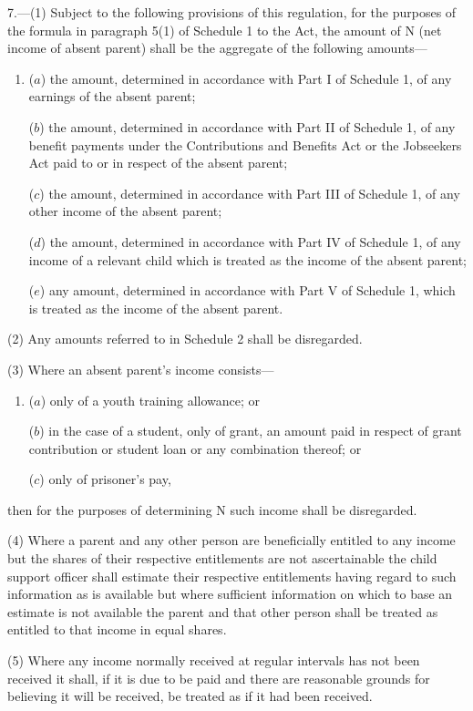 \documentclass[12pt,a4paper]{article}
\begin{document}
7.—(1) Subject to the following provisions of this regulation, for the purposes of the formula in paragraph 5(1) of Schedule 1 to the Act, the amount of N (net income of absent parent) shall be the aggregate of the following amounts—
\begin{enumerate}\item[]
($a$) the amount, determined in accordance with Part I of Schedule 1, of any earnings of the absent parent;

($b$) the amount, determined in accordance with Part II of Schedule 1, of any benefit payments under the Contributions and Benefits Act 
or the Jobseekers Act  %
paid to or in respect of the absent parent;

($c$) the amount, determined in accordance with Part III of Schedule 1, of any other income of the absent parent;

($d$) the amount, determined in accordance with Part IV of Schedule 1, of any income of a relevant child which is treated as the income of the absent parent;

($e$) any amount, determined in accordance with Part V of Schedule 1, which is treated as the income of the absent parent.
\end{enumerate}

(2) Any amounts referred to in Schedule 2 shall be disregarded.

(3) Where an absent parent’s income consists—
\begin{enumerate}\item[]
($a$) only of a youth training allowance; or

($b$) in the case of a student, only of grant, an amount paid in respect of grant contribution or student loan or any combination thereof; or

($c$) only of prisoner’s pay,
\end{enumerate}
then for the purposes of determining N such income shall be disregarded.

(4) Where a parent and any other person are beneficially entitled to any income but the shares of their respective entitlements are not ascertainable the child support officer shall estimate their respective entitlements having regard to such information as is available but where sufficient information on which to base an estimate is not available the parent and that other person shall be treated as entitled to that income in equal shares.

(5) Where any income normally received at regular intervals has not been received it shall, if it is due to be paid and there are reasonable grounds for believing it will be received, be treated as if it had been received.
\end{document}
